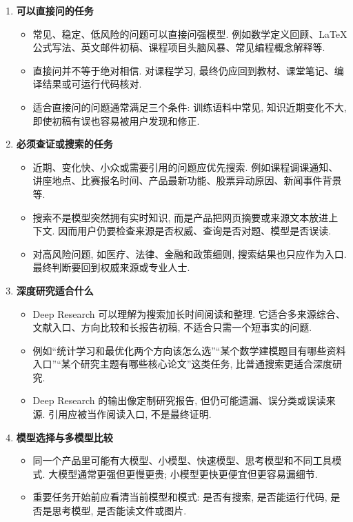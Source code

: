 \documentclass{../nndlcourse}
\begin{document}
\begin{enumerate}
  \item \textbf{可以直接问的任务}
    \begin{itemize}
      \item 常见、稳定、低风险的问题可以直接问强模型. 例如数学定义回顾、LaTeX 公式写法、英文邮件初稿、课程项目头脑风暴、常见编程概念解释等.
      \item 直接问并不等于绝对相信. 对课程学习, 最终仍应回到教材、课堂笔记、编译结果或可运行代码核对.
      \item 适合直接问的问题通常满足三个条件: 训练语料中常见, 知识近期变化不大, 即使初稿有误也容易被用户发现和修正.
    \end{itemize}
  \item \textbf{必须查证或搜索的任务}
    \begin{itemize}
      \item 近期、变化快、小众或需要引用的问题应优先搜索. 例如课程调课通知、讲座地点、比赛报名时间、产品最新功能、股票异动原因、新闻事件背景等.
      \item 搜索不是模型突然拥有实时知识, 而是产品把网页摘要或来源文本放进上下文. 因而用户仍要检查来源是否权威、查询是否对题、模型是否误读.
      \item 对高风险问题, 如医疗、法律、金融和政策细则, 搜索结果也只应作为入口. 最终判断要回到权威来源或专业人士.
    \end{itemize}
  \item \textbf{深度研究适合什么}
    \begin{itemize}
      \item Deep Research 可以理解为搜索加长时间阅读和整理. 它适合多来源综合、文献入口、方向比较和长报告初稿, 不适合只需一个短事实的问题.
      \item 例如“统计学习和最优化两个方向该怎么选”“某个数学建模题目有哪些资料入口”“某个研究主题有哪些核心论文”这类任务, 比普通搜索更适合深度研究.
      \item Deep Research 的输出像定制研究报告, 但仍可能遗漏、误分类或误读来源. 引用应被当作阅读入口, 不是最终证明.
    \end{itemize}
  \item \textbf{模型选择与多模型比较}
    \begin{itemize}
      \item 同一个产品里可能有大模型、小模型、快速模型、思考模型和不同工具模式. 大模型通常更强但更慢更贵; 小模型更快更便宜但更容易漏细节.
      \item 重要任务开始前应看清当前模型和模式: 是否有搜索, 是否能运行代码, 是否是思考模型, 是否能读文件或图片.

\end{itemize}
\end{enumerate}
\end{document}
